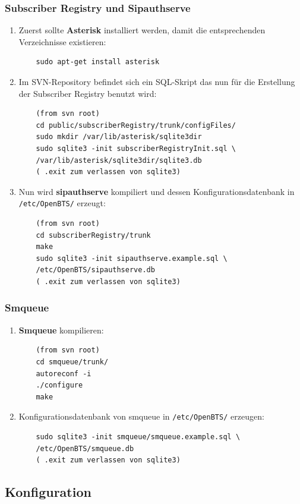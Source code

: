 \subsubsection{Subscriber Registry und Sipauthserve}
\begin{enumerate}
	\item Zuerst sollte \textbf{Asterisk} installiert werden, damit die entsprechenden Verzeichnisse existieren:
	\begin{verbatim}
	sudo apt-get install asterisk
	\end{verbatim}
	\item Im SVN-Repository befindet sich ein SQL-Skript das nun für die Erstellung der Subscriber Registry benutzt wird:
	\begin{verbatim}
	(from svn root)
	cd public/subscriberRegistry/trunk/configFiles/
	sudo mkdir /var/lib/asterisk/sqlite3dir
	sudo sqlite3 -init subscriberRegistryInit.sql \
	/var/lib/asterisk/sqlite3dir/sqlite3.db
	( .exit zum verlassen von sqlite3)
	\end{verbatim}
	\item Nun wird \textbf{sipauthserve} kompiliert und dessen Konfigurationsdatenbank in \verb|/etc/OpenBTS/| erzeugt:
	\begin{verbatim}
	(from svn root)
	cd subscriberRegistry/trunk
	make
	sudo sqlite3 -init sipauthserve.example.sql \
	/etc/OpenBTS/sipauthserve.db
	( .exit zum verlassen von sqlite3)
	\end{verbatim}
\end{enumerate}

\subsubsection{Smqueue}
\begin{enumerate}
	\item \textbf{Smqueue} kompilieren:
	\begin{verbatim}
	(from svn root)
	cd smqueue/trunk/
	autoreconf -i
	./configure
	make
	\end{verbatim}
	\item Konfigurationsdatenbank von smqueue in \verb|/etc/OpenBTS/| erzeugen:
	\begin{verbatim}
	sudo sqlite3 -init smqueue/smqueue.example.sql \
	/etc/OpenBTS/smqueue.db
	( .exit zum verlassen von sqlite3)
  \end{verbatim} 
\end{enumerate}

\subsection{Konfiguration}
\label{sec:Konfiguration}
